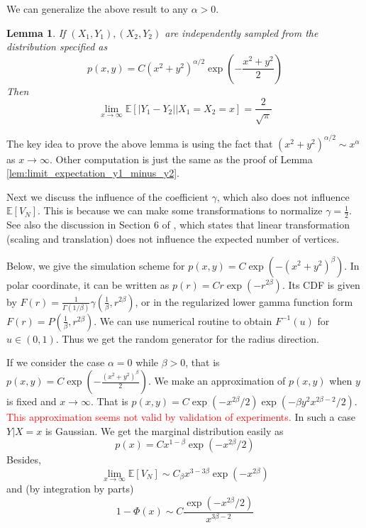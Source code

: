 \documentclass{article}
\newtheorem{lemma}{Lemma}
\def\E{\mathbb{E}}
\begin{document}
We can generalize the above result to any $\alpha>0$.
\begin{lemma}
    If $(X_1,Y_1), (X_2,Y_2)$ are independently
    sampled from the distribution specified as
    \begin{equation}\label{eq:exponential_tail_2d_alpha}
        p(x,y) = C(x^2+y^2)^{\alpha/2} \exp(-\frac{x^2+y^2}{2})    
    \end{equation}   
    Then 
    \begin{equation}\label{eq:abs_y1_y2_x_exp_tail_2}
    \lim_{x\to \infty} \E[|Y_1-Y_2| \Big\vert X_1=X_2=x] = \frac{2}{\sqrt{\pi}}
    \end{equation}
    \end{lemma}
The key idea to prove the above lemma is using the fact that
$(x^2+y^2)^{\alpha/2} \sim x^{\alpha}$ as $x\to \infty$.
Other computation is just the same as the proof of Lemma \ref{lem:limit_expectation_y1_minus_y2}.

Next we discuss the influence of the coefficient $\gamma$, which also does not influence $\E[V_N]$.
This is because we can make some transformations to normalize $\gamma=\frac{1}{2}$.
See also the discussion in Section 6 of \cite{efron1965convex}, which states that
linear transformation (scaling and translation)
does not influence the expected number of vertices.

Below, we give the simulation scheme
for $p(x,y)=C\exp(-(x^2+y^2)^\beta)$.
In polar coordinate, it can be written as
$p(r) = C r \exp(-r^{2\beta})$.
Its CDF is given by $F(r) = \frac{1}{\Gamma(1/\beta)}
\gamma(\frac{1}{\beta}, r^{2\beta})$,
or in the regularized lower gamma function
form $F(r) = P(\frac{1}{\beta}, r^{2\beta})$.
We can use numerical routine to obtain $F^{-1}(u)$
for $u\in (0,1)$. Thus we get the random generator for
the radius direction.

If we consider the case $\alpha=0$ while $\beta > 0$,
that is $p(x,y)=C\exp(-\frac{(x^2+y^2)^{\beta}}{2})$.
We make an approximation of $p(x,y)$ when $y$ is fixed and $x\to \infty$.
That is
$p(x,y)=C \exp(-x^{2\beta}/2) \exp(-\beta y^2 x^{2\beta-2}/2)$.
\textcolor{red}{This approximation seems not valid by validation of experiments.}
In such a case $Y|X=x$ is Gaussian.
We get the marginal distribution easily as 
$$
p(x) =C x^{1-\beta} \exp(-x^{2\beta}/2)
$$
Besides,
$$
\lim_{x\to \infty} \E[V_N]
\sim C_{\beta} x^{3-3\beta} \exp(-x^{2\beta})
$$
and (by integration by parts)
$$
1-\Phi(x) \sim C\frac{\exp(-x^{2\beta}/2)}{x^{3\beta - 2}}
$$
\end{document}
